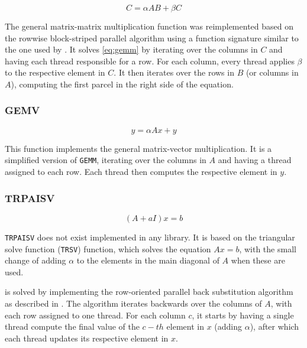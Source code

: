 \documentclass[../thesis]{subfiles}
\begin{document}
		\begin{equation}
			C = \alpha A B + \beta C
			\label{eq:gemm}
		\end{equation}

		The general matrix-matrix multiplication function was reimplemented based on the rowwise block-striped parallel algorithm \cite[277-281]{Quinn:PP:2003} using a function signature similar to the one used by \mkl. It solves \cref{eq:gemm} by iterating over the columns in $C$ and having each thread responsible for a row. For each column, every thread applies $\beta$ to the respective element in $C$. It then iterates over the rows in $B$ (or columns in $A$), computing the first parcel in the right side of the equation.

		\subsubsection{GEMV}

		\begin{equation}
			y = \alpha A x + y
			\label{eq:gemv}
		\end{equation}

		This function implements the general matrix-vector multiplication. It is a simplified version of \texttt{GEMM}, iterating over the columns in $A$ and having a thread assigned to each row. Each thread then computes the respective element in $y$.

		\subsubsection{TRPAISV}

		\begin{equation}
			(A + aI)x = b
			\label{eq:trpaisv}
		\end{equation}

		\texttt{TRPAISV} does not exist implemented in any \blas library. It is based on the triangular solve function (\texttt{TRSV}) function, which solves the equation $Ax = b$, with the small change of adding $\alpha$ to the elements in the main diagonal of $A$ when these are used.

		 is solved by implementing the row-oriented parallel back substitution algorithm as described in \cite[293-295]{Quinn:PP:2003}. The algorithm iterates backwards over the columns of $A$, with each row assigned to one thread. For each column $c$, it starts by having a single thread compute the final value of the $c-th$ element in $x$ (adding $\alpha$), after which each thread updates its respective element in $x$.
\end{document}
